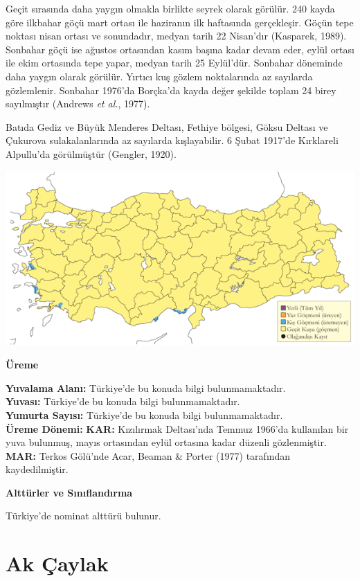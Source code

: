 \documentclass[
  a4paper,
  DIV=11,
  numbers=noendperiod]{scrreprt}
\begin{document}
Geçit sırasında daha yaygın olmakla birlikte seyrek olarak görülür. 240
kayda göre ilkbahar göçü mart ortası ile haziranın ilk haftasında
gerçekleşir. Göçün tepe noktası nisan ortası ve sonundadır, medyan tarih
22 Nisan'dır (Kasparek, 1989). Sonbahar göçü ise ağustos ortasından
kasım başına kadar devam eder, eylül ortası ile ekim ortasında tepe
yapar, medyan tarih 25 Eylül'dür. Sonbahar döneminde daha yaygın olarak
görülür. Yırtıcı kuş gözlem noktalarında az sayılarda gözlemlenir.
Sonbahar 1976'da Borçka'da kayda değer şekilde toplam 24 birey
sayılmıştır (Andrews \emph{et al.}, 1977).

Batıda Gediz ve Büyük Menderes Deltası, Fethiye bölgesi, Göksu Deltası
ve Çukurova sulakalanlarında az sayılarda kışlayabilir. 6 Şubat 1917'de
Kırklareli Alpullu'da görülmüştür (Gengler, 1920).

\includegraphics{images/harita_Page_081.png}

\textbf{Üreme}

\textbf{Yuvalama Alanı:} Türkiye'de bu konuda bilgi bulunmamaktadır.\\
\textbf{Yuvası:} Türkiye'de bu konuda bilgi bulunmamaktadır.\\
\textbf{Yumurta Sayısı:} Türkiye'de bu konuda bilgi bulunmamaktadır.\\
\textbf{Üreme Dönemi:} \textbf{KAR:} Kızılırmak Deltası'nda Temmuz
1966'da kullanılan bir yuva bulunmuş, mayıs ortasından eylül ortasına
kadar düzenli gözlenmiştir. \textbf{MAR:} Terkos Gölü'nde Acar, Beaman
\& Porter (1977) tarafından kaydedilmiştir.

\textbf{Alttürler ve Sınıflandırma}

Türkiye'de nominat alttürü bulunur.

\section{Ak Çaylak}\label{ak-uxe7aylak}
\end{document}
